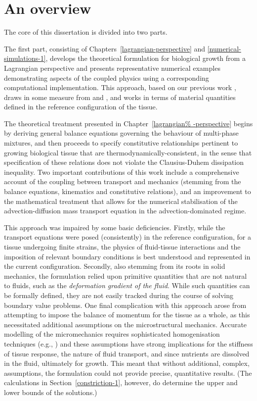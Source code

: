 \section{An overview}
\label{overview}

The core of this dissertation is divided into two parts.

The first part, consisting of Chapters~\ref{lagrangian-perspective}
and \ref{numerical-simulations-1}, develops the theoretical
formulation for biological growth from a Lagrangian perspective and
presents representative numerical examples demonstrating aspects of
the coupled physics using a corresponding computational
implementation. This approach, based on our previous work
\citep{growthpaper}, draws in some measure from
\citet{CowinHegedus:76, EpsteinMaugin:2000} and
\citet{TaberHumphrey:2001}, and works in terms of material quantities
defined in the reference configuration of the tissue.

The theoretical treatment presented in Chapter~\ref{lagrangian%
  -perspective} begins by deriving general balance equations governing
the behaviour of multi-phase mixtures, and then proceeds to specify
constitutive relationships pertinent to growing biological tissue that
are thermody\-namically-consistent, in the sense that specification of
these relations does not violate the Clausius-Duhem dissipation
inequality. Two important contributions of this work include a
comprehensive account of the coupling between transport and mechanics
(stemming from the balance equations, kinematics and constitutive
relations), and an improvement to the mathematical treatment that
allows for the numerical stabilisation of the advection-diffusion mass
transport equation in the advection-dominated regime.

This approach was impaired by some basic deficiencies. Firstly, while
the transport equations were posed (consistently) in the reference
configuration, for a tissue undergoing finite strains, the physics of
fluid-tissue interactions and the imposition of relevant boundary
conditions is best understood and represented in the current
configuration.  Secondly, also stemming from its roots in solid
mechanics, the formulation relied upon primitive quantities that are
not natural to fluids, such as the {\em deformation gradient of the
  fluid}. While such quantities can be formally defined, they are not
easily tracked during the course of solving boundary value
problems. One final complication with this approach arose from
attempting to impose the balance of momentum for the tissue as a
whole, as this necessitated additional assumptions on the
microstructural mechanics. Accurate modelling of the micromechanics
requires sophisticated homogenisation techniques (e.g.,
\citet{IdiartCastaneda:2003}) and these assumptions have strong
implications for the stiffness of tissue response, the nature of fluid
transport, and since nutrients are dissolved in the fluid, ultimately
for growth. This meant that without additional, complex, assumptions,
the formulation could not provide precise, quantitative results. (The
calculations in Section~\ref{constriction-1}, however, do determine
the upper and lower bounds of the solutions.)

